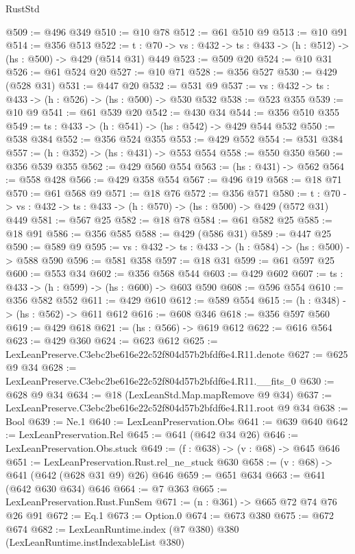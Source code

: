 \begin{lexlean}{RustStd}
\begin{coremodule}
@509 := @496 @349
@510 := @10 @78
@512 := @61 @510 @9
@513 := @10 @91
@514 := @356 @513
@522 := {t : @70} -> {vs : @432} -> {ts : @433} -> (h : @512) -> (hs : @500) -> @429 (@514 @31) @449
@523 := @509 @20
@524 := @10 @31
@526 := @61 @524 @20
@527 := @10 @71
@528 := @356 @527
@530 := @429 (@528 @31)
@531 := @447 @20
@532 := @531 @9
@537 := {vs : @432} -> {ts : @433} -> (h : @526) -> (hs : @500) -> @530 @532
@538 := @523 @355
@539 := @10 @9
@541 := @61 @539 @20
@542 := @430 @34
@544 := @356 @510 @355
@549 := {ts : @433} -> (h : @541) -> (hs : @542) -> @429 @544 @532
@550 := @538 @384
@552 := @356 @524 @355
@553 := @429 @552
@554 := @531 @384
@557 := (h : @352) -> (hs : @431) -> @553 @554
@558 := @550 @350
@560 := @356 @539 @355
@562 := @429 @560 @554
@563 := (hs : @431) -> @562
@564 := @558 @428
@566 := @429 @358 @554
@567 := @496 @19
@568 := @18 @71
@570 := @61 @568 @9
@571 := @18 @76
@572 := @356 @571
@580 := {t : @70} -> {vs : @432} -> {ts : @433} -> (h : @570) -> (hs : @500) -> @429 (@572 @31) @449
@581 := @567 @25
@582 := @18 @78
@584 := @61 @582 @25
@585 := @18 @91
@586 := @356 @585
@588 := @429 (@586 @31)
@589 := @447 @25
@590 := @589 @9
@595 := {vs : @432} -> {ts : @433} -> (h : @584) -> (hs : @500) -> @588 @590
@596 := @581 @358
@597 := @18 @31
@599 := @61 @597 @25
@600 := @553 @34
@602 := @356 @568 @544
@603 := @429 @602
@607 := {ts : @433} -> (h : @599) -> (hs : @600) -> @603 @590
@608 := @596 @554
@610 := @356 @582 @552
@611 := @429 @610
@612 := @589 @554
@615 := (h : @348) -> (hs : @562) -> @611 @612
@616 := @608 @346
@618 := @356 @597 @560
@619 := @429 @618
@621 := (hs : @566) -> @619 @612
@622 := @616 @564
@623 := @429 @360
@624 := @623 @612
@625 := LexLeanPreserve.C3ebc2be616e22c52f804d57b2bfdf6e4.R11.denote
@627 := @625 @9 @34
@628 := LexLeanPreserve.C3ebc2be616e22c52f804d57b2bfdf6e4.R11.__fits_0
@630 := @628 @9 @34
@634 := @18 (LexLeanStd.Map.mapRemove @9 @34)
@637 := LexLeanPreserve.C3ebc2be616e22c52f804d57b2bfdf6e4.R11.root @9 @34
@638 := Bool
@639 := Ne.{1}
@640 := LexLeanPreservation.Obs
@641 := @639 @640
@642 := LexLeanPreservation.Rel
@645 := @641 (@642 @34 @26)
@646 := LexLeanPreservation.Obs.stuck
@649 := (f : @638) -> (v : @68) -> @645 @646
@651 := LexLeanPreservation.Rust.rel_ne_stuck @630
@658 := (v : @68) -> @641 (@642 (@628 @31 @9) @26) @646
@659 := @651 @634
@663 := @641 (@642 @630 @634) @646
@664 := @7 @363
@665 := LexLeanPreservation.Rust.FunSem
@671 := (n : @361) -> @665 @72 @74 @76 @26 @91
@672 := Eq.{1}
@673 := Option.{0}
@674 := @673 @380
@675 := @672 @674
@682 := LexLeanRuntime.index (@7 @380) @380 (LexLeanRuntime.instIndexableList @380)

\end{coremodule}
\end{lexlean}
